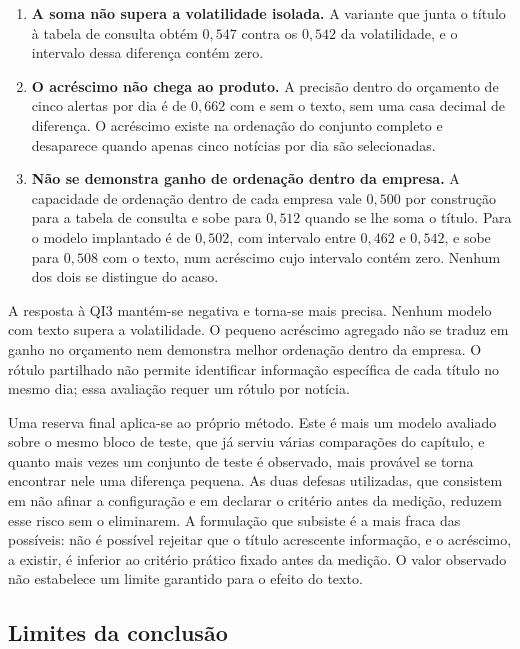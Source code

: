 \begin{enumerate}
\item \textbf{A soma não supera a volatilidade isolada.} A variante que junta o título à tabela de
consulta obtém $0{,}547$ contra os $0{,}542$ da volatilidade, e o intervalo dessa diferença contém
zero.

\item \textbf{O acréscimo não chega ao produto.} A precisão dentro do orçamento de cinco alertas por
dia é de $0{,}662$ com e sem o texto, sem uma casa decimal de diferença. O acréscimo existe na
ordenação do conjunto completo e desaparece quando apenas cinco notícias por dia são selecionadas.

\item \textbf{Não se demonstra ganho de ordenação dentro da empresa.} A capacidade de ordenação
dentro de cada empresa vale $0{,}500$ por construção para a tabela de consulta e sobe para $0{,}512$
quando se lhe soma o título. Para o modelo implantado é de $0{,}502$, com intervalo entre $0{,}462$ e
$0{,}542$, e sobe para $0{,}508$ com o texto, num acréscimo cujo intervalo contém zero. Nenhum dos
dois se distingue do acaso.
\end{enumerate}

A resposta à \gls{QI}3 mantém-se negativa e torna-se mais precisa. Nenhum modelo com texto supera a
volatilidade. O pequeno acréscimo agregado não se traduz em ganho no orçamento nem demonstra melhor
ordenação dentro da empresa. O rótulo partilhado não permite identificar informação específica de
cada título no mesmo dia; essa avaliação requer um rótulo por notícia.

Uma reserva final aplica-se ao próprio método. Este é mais um modelo avaliado sobre o mesmo bloco de
teste, que já serviu várias comparações do capítulo, e quanto mais vezes um conjunto de teste é
observado, mais provável se torna encontrar nele uma diferença pequena. As duas defesas utilizadas,
que consistem em não afinar a configuração e em declarar o critério antes da medição, reduzem esse
risco sem o eliminarem. A formulação que subsiste é a mais fraca das possíveis: não é possível
rejeitar que o título acrescente informação, e o acréscimo, a existir, é inferior ao critério prático
fixado antes da medição. O valor observado não estabelece um limite garantido para o efeito do texto.

\subsection{Limites da conclusão}

